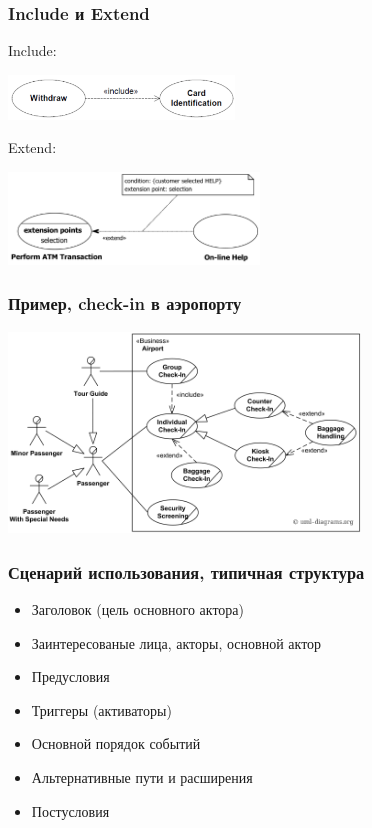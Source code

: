 \documentclass{../../slides-style}
\begin{document}
    \begin{frame}
        \frametitle{Include и Extend}
        Include:
        \begin{center}
            \includegraphics[width=0.45\textwidth]{useCaseInclude.png}
        \end{center}
        \vspace{5mm}
        Extend:
        \begin{center}
            \includegraphics[width=0.5\textwidth]{useCaseExtend.png}
        \end{center}
    \end{frame}

    \begin{frame}
        \frametitle{Пример, check-in в аэропорту}
        \begin{center}
            \includegraphics[width=0.7\textwidth]{airportUseCase.png}
        \end{center}
    \end{frame}

    \begin{frame}
        \frametitle{Сценарий использования, типичная структура}
        \begin{itemize}
            \item Заголовок (цель основного актора)
            \item Заинтересованые лица, акторы, основной актор
            \item Предусловия
            \item Триггеры (активаторы)
            \item Основной порядок событий
            \item Альтернативные пути и расширения
            \item Постусловия
        \end{itemize}
    \end{frame}
\end{document}
